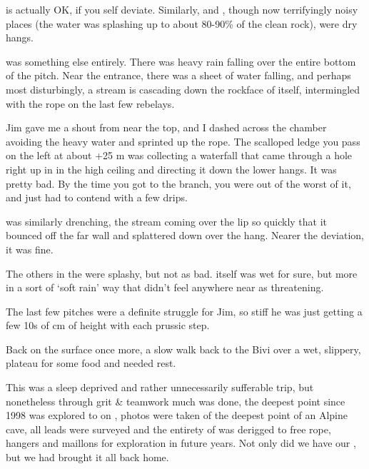  is actually OK, if you self deviate. Similarly,  and ,
though now terrifyingly noisy places (the water was splashing up to
about 80-90\% of the clean rock), were dry hangs.

 was something else entirely. There was heavy rain falling over the
entire bottom of the pitch. Near the  entrance, there was a sheet of
water falling, and perhaps most disturbingly, a stream is cascading down
the rockface of  itself, intermingled with the rope on the last few
rebelays.

Jim gave me a shout from near the top, and I dashed across the chamber
avoiding the heavy water and sprinted up the rope. The scalloped ledge
you pass on the left at about +25 m was collecting a waterfall that came
through a hole right up in in the high ceiling and directing it down the
lower hangs. It was pretty bad. By the time you got to the  branch, you were out of the worst of it, and just had to
contend with a few drips.

 was similarly drenching, the stream coming over the lip so
quickly that it bounced off the far wall and splattered down over the
hang. Nearer the deviation, it was fine.

The others in the  were splashy, but not as bad. 
itself was wet for sure, but more in a sort of `soft rain' way that
didn't feel anywhere near as threatening.

The last few pitches were a definite struggle for Jim, so stiff he was
just getting a few 10s of cm of height with each prussic step.

Back on the surface once more, a slow walk back to the Bivi over a wet,
slippery, plateau for some food and needed rest.

This was a sleep deprived and rather unnecessarily sufferable trip, but
nonetheless through grit \& teamwork much was done, the deepest point
since 1998 was explored to on , photos were taken of the deepest
point of an Alpine cave, all leads were surveyed and the entirety of
 was derigged to free rope, hangers and maillons for
exploration in future years. Not only did we have our , but
we had brought it all back home.

